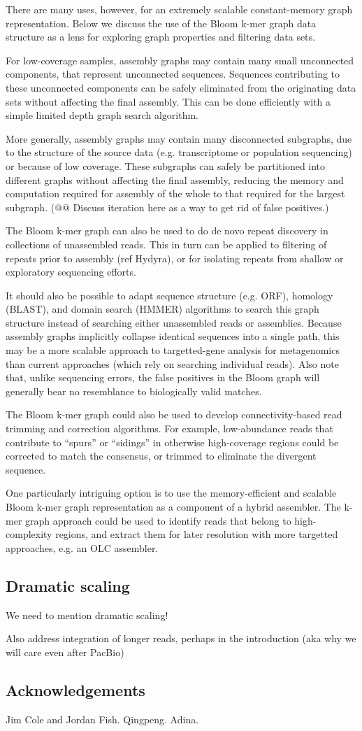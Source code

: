 \documentclass[12pt]{article} \usepackage{simplemargins}
\begin{document}
There are many uses, however, for an extremely scalable
constant-memory graph representation.  Below we discuss the use of the
Bloom k-mer graph data structure as a lens for exploring graph
properties and filtering data sets.

For low-coverage samples, assembly graphs may contain many small
unconnected components, that represent unconnected sequences.
Sequences contributing to these unconnected components can be safely
eliminated from the originating data sets without affecting the final
assembly.  This can be done efficiently with a simple limited depth
graph search algorithm.

More generally, assembly graphs may contain many disconnected
subgraphs, due to the structure of the source data (e.g. transcriptome
or population sequencing) or because of low coverage.  These subgraphs
can safely be partitioned into different graphs without affecting the
final assembly, reducing the memory and computation required for
assembly of the whole to that required for the largest subgraph.
(@@ Discuss iteration here as a way to get rid of false positives.)

The Bloom k-mer graph can also be used to do de novo repeat discovery
in collections of unassembled reads.  This in turn can be applied to
filtering of repeats prior to assembly (ref Hydyra), or for isolating
repeats from shallow or exploratory sequencing efforts.

It should also be possible to adapt sequence structure (e.g. ORF),
homology (BLAST), and domain search (HMMER) algorithms to search this
graph structure instead of searching either unassembled reads or
assemblies.  Because assembly graphs implicitly collapse identical
sequences into a single path, this may be a more scalable approach to
targetted-gene analysis for metagenomics than current approaches
(which rely on searching individual reads).  Also note that, unlike
sequencing errors, the false positives in the Bloom graph will
generally bear no resemblance to biologically valid matches.

The Bloom k-mer graph could also be used to develop connectivity-based
read trimming and correction algorithms.  For example, low-abundance
reads that contribute to ``spurs'' or ``sidings'' in otherwise
high-coverage regions could be corrected to match the
consensus, or trimmed to eliminate the divergent sequence.

One particularly intriguing option is to use the memory-efficient and
scalable Bloom k-mer graph representation as a component of a hybrid
assembler.  The k-mer graph approach could be used to identify
reads that belong to high-complexity regions, and extract them for
later resolution with more targetted approaches, e.g. an OLC assembler.

\subsection{Dramatic scaling}

We need to mention dramatic scaling!

Also address integration of longer reads, perhaps in the introduction
(aka why we will care even after PacBio)

\subsection{Acknowledgements}

Jim Cole and Jordan Fish.  Qingpeng.  Adina.
\end{document}
